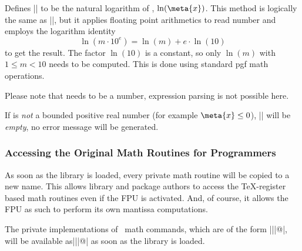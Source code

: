 \begin{command}{}
	Defines |\pgfmathresult| to be the natural logarithm of , $\ln(\meta{x})$. This method is logically the same as |\pgfmathln|, but it applies floating point arithmetics to read number  and employs the logarithm identity 
		\[ \ln(m \cdot 10^e) = \ln(m) + e \cdot \ln(10) \]
	to get the result. The factor $\ln(10)$ is a constant, so only $\ln(m)$ with $1 \le m < 10$ needs to be computed. This is done using standard pgf math operations.

	Please note that  needs to be a number, expression parsing is not possible here.

	If  is \emph{not} a bounded positive real number (for example $\meta{x} \le 0$), |\pgfmathresult| will be \emph{empty}, no error message will be generated.
\begin{codeexample}[]
\pgfmathresult
\end{codeexample}
\begin{codeexample}[]
\pgfmathresult
\end{codeexample}
\end{command}

\subsubsection{Accessing the Original Math Routines for Programmers}
As soon as the library is loaded, every private math routine will be copied to a new name.
This allows library and package authors to access the \TeX-register based math routines even if the FPU is activated. And, of course, it allows the FPU as such to perform its own mantissa computations.

The private implementations of \pgfname\ math commands, which are of the form |\pgfmath||@|, will be available as|\pgfmath@basic@||@| as soon as the library is loaded.


\endgroup
